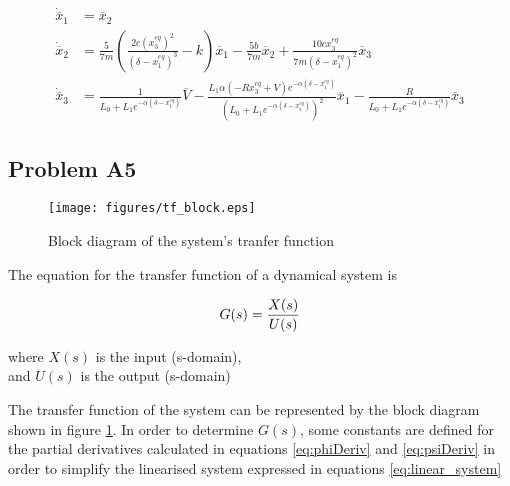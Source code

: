 \documentclass[a4paper,10pt,reqno]{amsart}
\numberwithin{equation}{section}
\begin{document}
\begin{subequations}\label{eq:linear_system}
     \begin{align}
          \dot{\overline{x}}_1 &= \overline{x}_2 \\
          \dot{\overline{x}}_2 &= \frac{5}{7 m}\left(\frac{2 c (x_{3}^{eq})^{2}}{\left(\delta - x_{1}^{eq}\right)^{3}} - k\right)\overline{x}_1  - \frac{5 b}{7 m}\overline{x}_2 + \frac{10 c x_{3}^{eq}}{7 m \left(\delta - x_{1}^{eq}\right)^{2}}\overline{x}_3\\
          \dot{\overline{x}}_3 &= \frac{1}{L_{0} + L_{1} e^{- \alpha \left(\delta - x_{1}^{eq}\right)}}\overline{V} - \frac{L_{1} \alpha \left(- R x_{3}^{eq} + V\right) e^{- \alpha \left(\delta - x_{1}^{eq}\right)}}{\left(L_{0} + L_{1} e^{- \alpha \left(\delta - x_{1}^{eq}\right)}\right)^{2}}\overline{x}_1 - \frac{R}{L_{0} + L_{1} e^{- \alpha \left(\delta - x_{1}^{eq}\right)}}\overline{x}_3
     \end{align}
\end{subequations}

\subsection{Problem A5}\label{sec:a5}\hfill

\setlength{\jot}{5pt} %

\begin{figure}[H]
     \texttt{[image: figures/tf\_block.eps]}
     \caption{Block diagram of the system's tranfer function}
     \label{fig:tfBlock}
\end{figure}

The equation for the transfer function of a dynamical system is

\begin{equation}
     G(s) = \frac{X(s)}{U(s)} \label{eq:TF} \\
\end{equation}

\begin{center}
     where $X(s)$ is the input (s-domain), \\
     and $U(s)$ is the output (s-domain)
\end{center}
\vspace{10pt}

The transfer function of the system can be represented by the block diagram shown in figure \ref{fig:tfBlock}. In order to determine $G(s)$, some constants are defined for the partial derivatives calculated in equations \ref{eq:phiDeriv} and \ref{eq:psiDeriv} in order to simplify the linearised system expressed in equations \ref{eq:linear_system}
\end{document}
